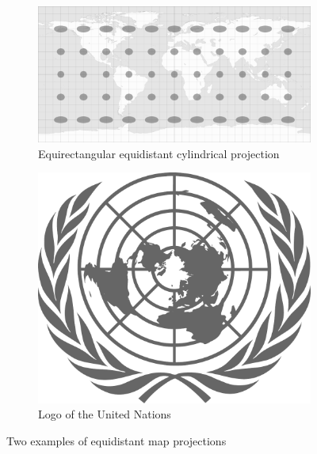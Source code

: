 \vspace{0.5em} %
\begin{figure}[ht]
  \centering
  \begin{subfigure}{0.62\textwidth}
    \centering
    \includegraphics[width=0.9\linewidth]{graphics/basics/projection_distortion_equirectangular.png}
    \caption{Equirectangular equidistant cylindrical projection \protect\footnotemark}
  \end{subfigure}
  \begin{subfigure}{0.37\textwidth}
    \centering
    \includegraphics[width=0.9\linewidth]{graphics/basics/un_logo}
    \caption{Logo of the United Nations \protect\footnotemark}
  \end{subfigure}
  \caption{Two examples of equidistant map projections}
  \label{fig:equidistant_projections}
\end{figure}

\addtocounter{footnote}{-1}

